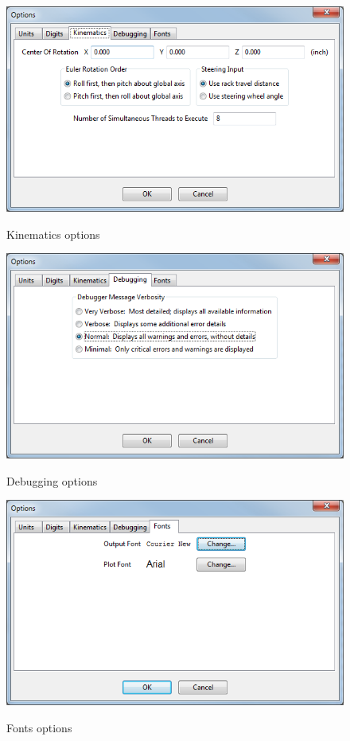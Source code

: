 \begin{figure}
\includegraphics[width=\textwidth]{images/optionsKinematics} \label{fig:optionsKinematics}
\caption{Kinematics options}
\centering
\end{figure}

\begin{figure}
\includegraphics[width=\textwidth]{images/optionsDebugging} \label{fig:optionsDebugging}
\caption{Debugging options}
\centering
\end{figure}

\begin{figure}
\includegraphics[width=\textwidth]{images/optionsFonts} \label{fig:optionsFonts}
\caption{Fonts options}
\centering
\end{figure}
